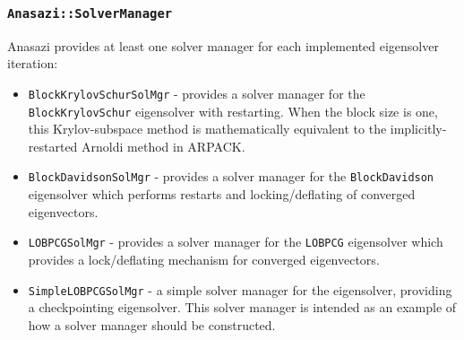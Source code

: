 \documentclass[acmtoms]{acmtrans2m}
\newcommand{\aspace}[1]{\texttt{#1}}
\begin{document}
\subsubsection{\aspace{Anasazi::SolverManager}}

Anasazi provides at least one solver manager for each implemented eigensolver iteration:
\begin{itemize}
  \item \aspace{BlockKrylovSchurSolMgr} - provides a solver manager for the
    \aspace{BlockKrylovSchur} eigensolver with restarting.
  When the block size is one, this Krylov-subspace method is mathematically equivalent to the
  implicitly-restarted Arnoldi method in ARPACK. 
  \item \aspace{BlockDavidsonSolMgr} - provides a solver manager for the
    \aspace{BlockDavidson} eigensolver which performs restarts and locking/deflating of
    converged eigenvectors.
  \item \aspace{LOBPCGSolMgr} - provides a solver manager for the \aspace{LOBPCG}
    eigensolver which provides a lock/deflating mechanism for converged eigenvectors.
  \item \aspace{SimpleLOBPCGSolMgr} - a simple solver manager for the 
    eigensolver, providing a checkpointing eigensolver. This solver manager is intended
    as an example of how a solver manager should be constructed.
\end{itemize}


\end{document}
